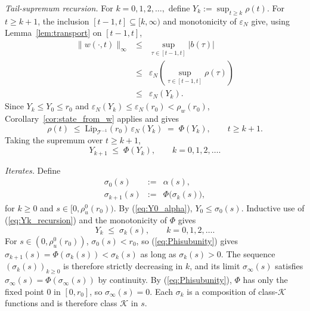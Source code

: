\documentclass[10pt,a4paper]{amsart}
\newcommand{\Tcal}{\mathcal{T}}
\newcommand{\LipT}{\mathrm{Lip}_{\Tcal^{-1}}}
\newcommand{\eps}{\varepsilon}
\begin{document}
\emph{Tail-supremum recursion.} For $k = 0, 1, 2, \ldots,$ define $Y_k := \sup_{t \ge k}\rho(t)$.
For $t \ge k+1$, the inclusion $[t-1, t] \subseteq [k, \infty)$ and monotonicity of $\eps_N$ give, using Lemma~\ref{lem:transport} on $[t-1, t]$,
\begin{eqnarray}
\|w(\cdot, t)\|_\infty &\le& \sup_{\tau \in [t-1, t]} |b(\tau)| \nonumber \\
&\le& \eps_N\!\left(\sup_{\tau \in [t-1, t]}\rho(\tau)\right) \nonumber \\
&\le& \eps_N(Y_k).
\label{eq:w_in_window}
\end{eqnarray}
Since $Y_k \le Y_0 \le r_0$ and $\eps_N(Y_k) \le \eps_N(r_0) < \rho_w(r_0)$, Corollary~\ref{cor:state_from_w} applies and gives
\begin{equation}
\rho(t) \;\le\; \LipT(r_0)\,\eps_N(Y_k) \;=\; \Phi(Y_k), \qquad t \ge k+1.
\label{eq:rho_Phi_Yk}
\end{equation}
Taking the supremum over $t \ge k+1$,
\begin{equation}
Y_{k+1} \;\le\; \Phi(Y_k), \qquad k = 0, 1, 2, \ldots.
\label{eq:Yk_recursion}
\end{equation}

\emph{Iterates.} Define
\begin{eqnarray}
\sigma_0(s) &:=& \alpha(s), \nonumber \\
\sigma_{k+1}(s) &:=& \Phi\bigl(\sigma_k(s)\bigr),
\label{eq:sigma_iterate}
\end{eqnarray}
for $k \ge 0$ and $s \in [0, \rho_u^0(r_0))$.
By (\ref{eq:Y0_alpha}), $Y_0 \le \sigma_0(s)$. Inductive use of (\ref{eq:Yk_recursion}) and the monotonicity of $\Phi$ gives
\begin{equation}
Y_k \;\le\; \sigma_k(s), \qquad k = 0, 1, 2, \ldots.
\label{eq:Yk_sigma}
\end{equation}
For $s \in (0, \rho_u^0(r_0))$, $\sigma_0(s) < r_0$, so (\ref{eq:Phisubunity}) gives $\sigma_{k+1}(s) = \Phi(\sigma_k(s)) < \sigma_k(s)$ as long as $\sigma_k(s) > 0$. The sequence $(\sigma_k(s))_{k \ge 0}$ is therefore strictly decreasing in $k$, and its limit $\sigma_\infty(s)$ satisfies $\sigma_\infty(s) = \Phi(\sigma_\infty(s))$ by continuity. By (\ref{eq:Phisubunity}), $\Phi$ has only the fixed point $0$ in $[0, r_0]$, so $\sigma_\infty(s) = 0$. Each $\sigma_k$ is a composition of class-$\mathcal{K}$ functions and is therefore class $\mathcal{K}$ in $s$.
\end{document}
